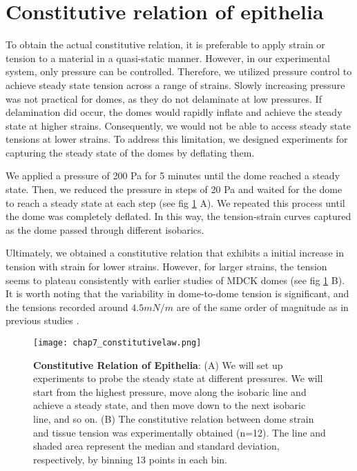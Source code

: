 \hypertarget{constitutive-relation-of-epithelia}{%
	\section{Constitutive relation of
		epithelia}\label{constitutive-relation-of-epithelia}}

To obtain the actual constitutive relation, it is preferable to apply strain or tension to a material in a quasi-static manner. However, in our experimental system, only pressure can be controlled. Therefore, we utilized pressure control to achieve steady state tension across a range of strains. Slowly increasing pressure was not practical for domes, as they do not delaminate at low pressures. If delamination did occur, the domes would rapidly inflate and achieve the steady state at higher strains. Consequently, we would not be able to access steady state tensions at lower strains. To address this limitation, we designed experiments for capturing the steady state of the domes by deflating them.

We applied a pressure of 200 Pa for 5 minutes until the dome reached a steady state. Then, we reduced the pressure in steps of 20 Pa and waited for the dome to reach a steady state at each step (see fig \ref{fig_7_5} A). We repeated this process until the dome was completely deflated. In this way, the tension-strain curves captured as the dome passed through different isobarics.

Ultimately, we obtained a constitutive relation that exhibits a initial increase in tension with  strain for lower strains. However, for larger strains, the tension seems to plateau consistently with earlier studies of MDCK domes (see fig \ref{fig_7_5} B). It is worth noting that the variability in dome-to-dome tension is significant, and the tensions recorded around $4.5 mN/m$ are of the same order of magnitude as in previous studies \cite{latorre2018, marin-llaurado2022}.

\begin{figure}
	\centering
	\texttt{[image: chap7\_constitutivelaw.png]}
	\caption{\label{fig_7_5} \textbf{Constitutive Relation of Epithelia}: (A) We will set up experiments to probe the steady state at different pressures. We will start from the highest pressure, move along the isobaric line and achieve a steady state, and then move down to the next isobaric line, and so on.	(B) The constitutive relation between dome strain and tissue tension was experimentally obtained (n=12). The line and shaded area represent the median and standard deviation, respectively, by binning 13 points in each bin.
	}
\end{figure}


